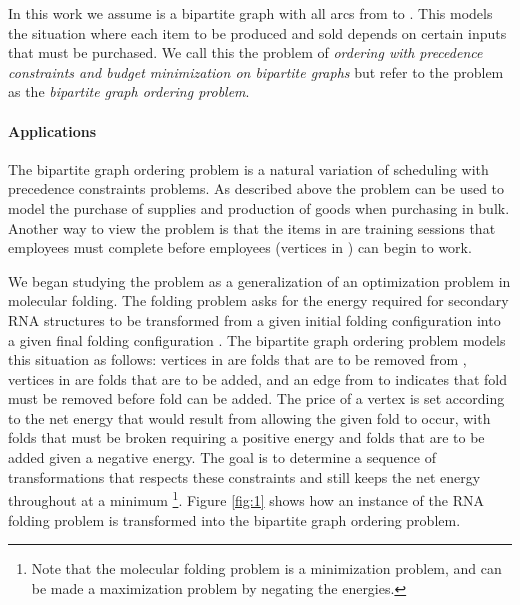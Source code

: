 \documentclass[letterpaper,11pt,abstracton]{scrartcl}
\begin{document}
In this work we assume  is a bipartite graph with all arcs from
 to .  This models the situation where each item to be produced and
sold depends on certain inputs that must be purchased.
We call this the problem of \emph{ordering with precedence
  constraints and budget minimization on bipartite graphs} but refer
to the problem as the \emph{bipartite graph ordering problem}.

\paragraph{Applications}
The bipartite graph ordering problem is a natural variation of scheduling with
precedence constraints problems.  As described above the problem can be used
to model the purchase of supplies and production of goods when purchasing in
bulk.  Another way to view the problem is that the items in  are training sessions that employees must complete before employees (vertices in ) can
begin to work.

We began studying the problem as a generalization of an optimization
problem in molecular folding.  The folding problem asks for the energy
required for secondary RNA structures to be transformed from a given
initial folding configuration  into a given final folding
configuration  \cite{GFWT08,MH98,TMRM09}. The bipartite graph ordering problem models
this situation as follows: vertices in  are folds that are to be
removed from , vertices in  are folds that are to be
added, and an edge from  to  indicates that fold  must be
removed before fold  can be added.  The price  of a vertex is set
according to the net energy that would result from allowing the given
fold to occur, with folds that must be broken requiring a positive
energy and folds that are to be added given a negative energy.  The
goal is to determine a sequence of transformations that respects these
constraints and still keeps the net energy throughout at a minimum
\footnote{Note that the molecular folding problem is a minimization problem,
  and can be made a maximization problem by negating the energies.
}.
Figure \ref{fig:1} shows how an instance of the RNA folding problem is
transformed into the bipartite graph ordering problem.
\end{document}
